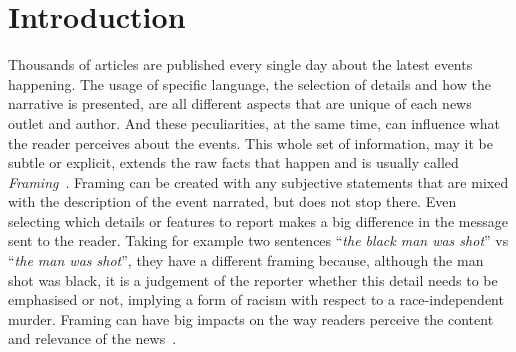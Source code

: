 \chapter{Introduction}


Thousands of articles are published every single day about the latest events happening.
The usage of specific language, the selection of details and how the narrative is presented, are all different aspects that are unique of each news outlet and author.
And these peculiarities, at the same time, can influence what the reader perceives about the events.
This whole set of information, may it be subtle or explicit, extends the raw facts that happen and is usually called \emph{Framing}~\cite{gamson1989media,scheufele1999framing}.
Framing can be created with any subjective statements that are mixed with the description of the event narrated, but does not stop there.
Even selecting which details or features to report makes a big difference in the message sent to the reader.
Taking for example two sentences ``\textit{the black man was shot}'' vs ``\textit{the man was shot}'', they have a different framing because, although the man shot was black, it is a judgement of the reporter whether this detail needs to be emphasised or not, implying a form of racism with respect to a race-independent murder.
Framing can have big impacts on the way readers perceive the content and relevance of the news~\cite{cohen2015press}. %



